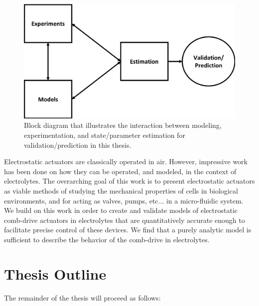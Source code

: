 \begin{figure}[h]
    \includegraphics[width=\linewidth]{Chapter1/bockdiagrams.png}
    \caption{Block diagram that illustrates the interaction between modeling, experimentation, and state/parameter estimation for validation/prediction in this thesis.}\label{block_diagram}
\end{figure}

Electrostatic actuators are classically operated in air. However, impressive work has been done on how they can be operated, and modeled, in the context of electrolytes. The overarching goal of this work is to present electrostatic actuators as viable methods of studying the mechanical properties of cells in biological environments, and for acting as valves, pumps, etc... in a micro-fluidic system. We build on this work in order to create and validate models of electrostatic comb-drive actuators in electrolytes that are quantitatively accurate enough to facilitate precise control of these devices. We find that a purely analytic model is sufficient to describe the behavior of the comb-drive in electrolytes.

\section{Thesis Outline} %

The remainder of the thesis will proceed as follows:

